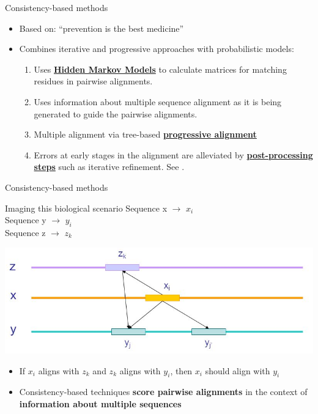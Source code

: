 \begin{frame}{Consistency-based methods \cite{saeed2009overview}}

    \begin{itemize}    
        \item Based on: “prevention is the best medicine”
        \item Combines iterative and progressive approaches with probabilistic models:
        \begin{enumerate}
        \renewcommand{\baselinestretch}{2}
        \item Uses \textbf{\underline{Hidden Markov Models}} to calculate matrices for matching residues in pairwise alignments. 
        \item Uses information about multiple sequence alignment as it is being generated to guide the pairwise alignments.
        \item Multiple alignment via tree-based \textbf{\underline{progressive alignment}}
        \item Errors at early stages in the alignment are alleviated by \textbf{\underline{post-processing steps}} such as iterative refinement. See \cite{wallace2005multiple}.
        \end{enumerate}

    \end{itemize}
    
\end{frame}

\begin{frame}{Consistency-based methods}

    \begin{block}{Imaging this biological scenario \cite{pevsner2015bioinformatics}}
    \centering
            \large Sequence x $\rightarrow$ $ x_{i}$ \\
            \large Sequence y $\rightarrow$ $ y_{i}$ \\
            \large Sequence z $\rightarrow$ $ z_{k}$ \\
    \end{block}
    \centering
    \includegraphics[width=0.65\linewidth]{img/xyz.PNG}
    \begin{itemize}
        \item If $ x_{i}$ aligns with $ z_{k}$ and $ z_{k}$ aligns with $ y_{i}$, then $x_{i}$ should align with $ y_{i}$
    \end{itemize}
    \begin{itemize}
            \item Consistency-based techniques \textbf{score pairwise alignments} in the context of \textbf{information about multiple sequences}
    \end{itemize}
\end{frame}